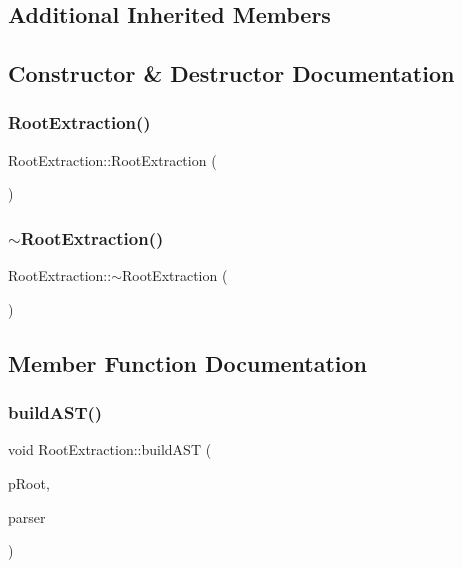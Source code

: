 \subsection*{Additional Inherited Members}


\subsection{Constructor \& Destructor Documentation}
\mbox{\label{class_root_extraction_a9f1c5076e910b8d34a8f6859743d775b}} 
\subsubsection{\texorpdfstring{RootExtraction()}{RootExtraction()}}
{\footnotesize\ttfamily Root\+Extraction\+::\+Root\+Extraction (\begin{DoxyParamCaption}{ }\end{DoxyParamCaption})}

\mbox{\label{class_root_extraction_ac06e112ea536a85cfdc63f9f55556d31}} 
\subsubsection{\texorpdfstring{$\sim$RootExtraction()}{~RootExtraction()}}
{\footnotesize\ttfamily Root\+Extraction\+::$\sim$\+Root\+Extraction (\begin{DoxyParamCaption}{ }\end{DoxyParamCaption})}



\subsection{Member Function Documentation}
\mbox{\label{class_root_extraction_a2c50c1676599c87fe480ae19cd701f1d}} 
\subsubsection{\texorpdfstring{buildAST()}{buildAST()}}
{\footnotesize\ttfamily void Root\+Extraction\+::build\+A\+ST (\begin{DoxyParamCaption}\item[{std\+::unique\+\_\+ptr$<$ \mbox{\hyperlink{class_abstract_expression}{Abstract\+Expression}} $>$ \&}]{p\+Root,  }\item[{\mbox{\hyperlink{class_parser}{Parser}} \&}]{parser }\end{DoxyParamCaption})\hspace{0.3cm}{\ttfamily [virtual]}}



